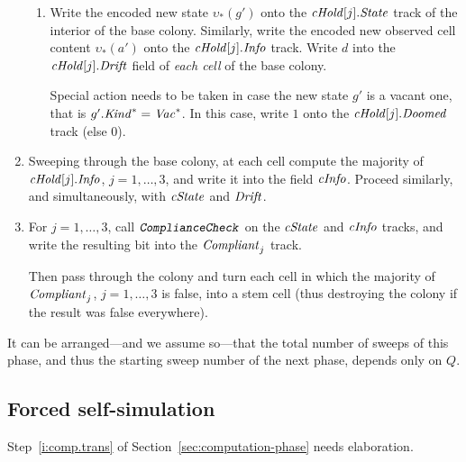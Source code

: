 \documentclass[12pt]{memoir}
\newcommand{\fld}[1]{\ensuremath{\textit{#1\/}}}
\newcommand{\rul}[1]{\ensuremath{\texttt{\slshape #1\/}}}
\newcommand{\Vacant}{\mathit{Vac}}
\newcommand{\Q}{Q}
\newcommand{\Drift}{\fld{Drift}}
\newcommand{\Doomed}{\fld{Doomed}}
\newcommand{\cHold}{\fld{cHold}}
\newcommand{\Info}{\fld{Info}}
\newcommand{\cInfo}{\fld{cInfo}}
\newcommand{\Kind}{\fld{Kind}}
\newcommand{\State}{\fld{State}}
\newcommand{\cState}{\fld{cState}}
\begin{document}
\begin{enumerate}
\begin{enumerate}
            \item\label{i:comp.write}
              Write the encoded new state \( \upsilon_{*}(g') \) onto the
              \( \cHold[j].\State \) track of the interior of the base colony.
              Similarly, write the encoded new observed cell
              content \( \upsilon_{*}(a') \) onto the \( \cHold[j].\Info \) track.
              Write \( d \) into the \( \cHold[j].\Drift \) field of \emph{each cell} of
              the base colony.

              Special action needs to be taken in case 
              the new state \( g' \) is a vacant one, that is 
              \( g'.\Kind^{*}=\Vacant^{*} \).
              In this case, write \( 1 \) onto the \( \cHold[j].\Doomed \) track (else 0).

        \end{enumerate}

       \item
            Sweeping through the base colony,
            at each cell compute the majority of \( \cHold[j].\Info \), \( j=1,\dots,3 \),
            and write it into the field \( \cInfo \).
            Proceed similarly, and simultaneously, with \( \cState \) and \( \Drift \).

       \item       For \( j=1,\dots,3 \), call \( \rul{ComplianceCheck} \) on the \( \cState \)
and \( \cInfo \) tracks, and
write the resulting bit into the \( \fld{Compliant}_{j} \) track.

Then pass through the colony and turn each cell in which the majority 
of \( \fld{Compliant}_{j} \), \( j=1,\dots,3 \) is false, into a stem cell
(thus destroying the colony if the result was false everywhere).

  \end{enumerate}

It can be arranged---and we assume so---that the total number of sweeps of this
phase, and thus the starting sweep number of the next phase,
depends only on \( \Q \).

\subsection{Forced self-simulation}\label{sec:self-simulation}

Step~\ref{i:comp.trans} of Section~\ref{sec:computation-phase} needs elaboration.
\end{document}
